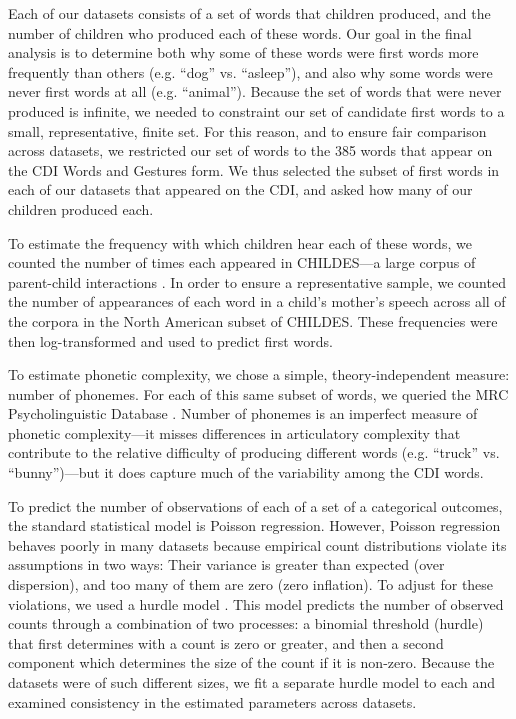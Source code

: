 \documentclass[10pt,letterpaper]{article}
\begin{document}
Each of our datasets consists of a set of words that children produced, and the number of children who produced each of these words. Our goal in the final analysis is to determine both why some of these words were first words more frequently than others (e.g. ``dog'' vs. ``asleep''), and also why some words were never first words at all (e.g. ``animal''). Because the set of words that were never produced is infinite, we needed to constraint our set of candidate first words to a small, representative, finite set. For this reason, and to ensure fair comparison across datasets, we restricted our set of words to the 385 words that appear on the CDI Words and Gestures form. We thus selected the subset of first words in each of our datasets that appeared on the CDI, and asked how many of our children produced each.

To estimate the frequency with which children hear each of these words, we counted the number of times each appeared in CHILDES---a large corpus of parent-child interactions \cite{macwhinney2000}. In order to ensure a representative sample, we counted the number of appearances of each word in a child's mother's speech across all of the corpora in the North American subset of CHILDES. These frequencies were then log-transformed and used to predict first words.

To estimate phonetic complexity, we chose a simple, theory-independent measure: number of phonemes. For each of this same subset of words, we queried the MRC Psycholinguistic Database \cite{Wilson1988}. Number of phonemes is an imperfect measure of phonetic complexity---it misses differences in articulatory complexity that contribute to the relative difficulty of producing different words (e.g. ``truck'' vs. ``bunny'')---but it does capture much of the variability among the CDI words.

To predict the number of observations of each of a set of a categorical outcomes, the standard statistical model is Poisson regression. However, Poisson regression behaves poorly in many datasets because empirical count distributions violate its assumptions in two ways: Their variance is greater than expected (over dispersion), and too many of them are zero (zero inflation). To adjust for these violations, we used a hurdle model \cite{mullahy1986}. This model predicts the number of observed counts through a combination of two processes: a binomial threshold (hurdle) that first determines with a count is zero or greater, and then a second component which determines the size of the count if it is non-zero. Because the datasets were of such different sizes, we fit a separate hurdle model to each and examined consistency in the estimated parameters across datasets.
\end{document}
